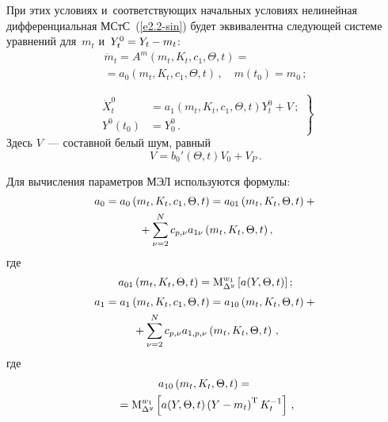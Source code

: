 \begin{multicols}{2}
При этих условиях и~соответствующих начальных условиях нелинейная
 дифференциальная МСтС~(\ref{e2.2-sin}) будет эквивалентна следующей
системе уравнений для~$m_t$ и~$Y_t^0\hm = Y_t\hm-m_t$:
\begin{multline}
    \dot m_t =A^{m} \left(m_t, K_t, c_1,\Theta,t\right)={}\\
    {}=
    a_0 \left(m_t,K_t,c_1,\Theta,t\right)\,,\quad
    m(t_0) = m_0\,;\label{e4.5-sin}
    \end{multline}
    
    \vspace*{-9pt}
    
\noindent
    \begin{equation}
    \left.
    \begin{array}{rl}
    \dot X_t^0 &= a_1 \left(m_t,K_t,c_1,\Theta,t\right) Y_t^0 +V\,;\\[6pt] 
    Y^0\!\left (t_0\right)&=
    Y_0^0\,.
    \end{array}
    \right\}
    \label{e4.6-sin}
    \end{equation}
Здесь $V$~--- составной белый шум, равный
   \begin{equation*}
   V= b_0' (\Theta,t) V_0 +V_P\,. %
   \end{equation*}

Для вычисления параметров %
МЭЛ используются фор\-мулы:
    \begin{multline*}
    a_{0}=a_0\left(m_t,K_t,c_1,\Theta,t\right)=a_{01} \left(m_t,K_t,\Theta,t\right)
    +{}\\
    {}+\sum\limits_{\nu=2}^N c_{p,\nu}a_{1\nu} \left(m_t,K_t,\Theta,t\right),
    \end{multline*}
где
$$
    a_{01} \left(m_t,K_t,\Theta,t\right) =\mathrm{M}_{\Delta^y}^{w_1} 
    \left[ a(Y, \Theta, t)\right];
$$
    \begin{multline}
    a_{1}=a_1 \left(m_t,K_t,c_1,\Theta,t\right) =a_{10}
    \left(m_t,K_t,\Theta,t\right) +{}\\
    {}+ \sum\limits_{\nu=2}^N c_{p,\nu} a_{1,p,\nu}
    \left(m_t,K_t,\Theta,t\right)\,,
    \label{e4.8-sin}
    \end{multline}
    где
    \begin{multline*}
    a_{10} \left(m_t,K_t,\Theta,t\right) ={}\\
    {}=\mathrm{M}_{\Delta^y}^{w_1} 
    \left[a(Y,\Theta, t) \left(Y-m_t\right)^{\mathrm{T}} K_t^{-1}\right]\,,
    \end{multline*}
    

\end{multicols}
